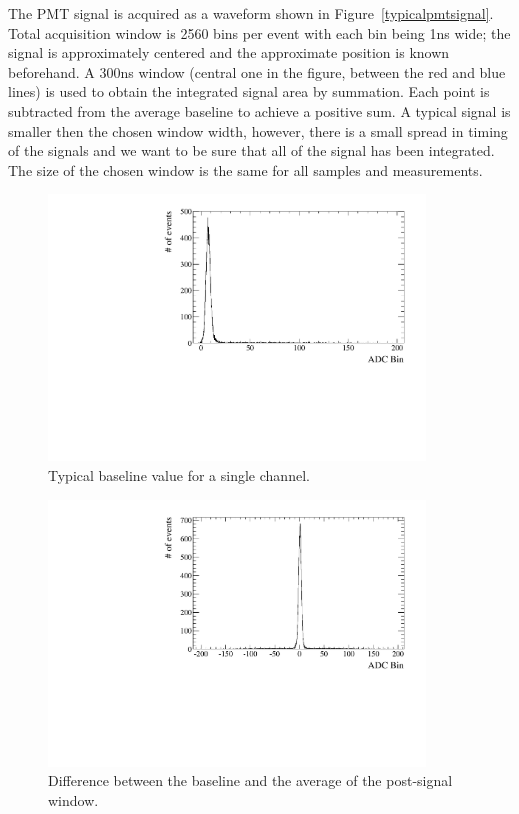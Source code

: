 \documentclass[preprint,12pt]{elsarticle}
\begin{document}
The PMT signal is acquired as a waveform shown in Figure~\ref{typicalpmtsignal}. Total acquisition window is 2560 bins per event with each bin being 1ns wide; the signal is approximately centered and the approximate position is known beforehand. A 300ns window (central one in the figure, between the red and blue lines) is used to obtain the integrated signal area by summation. Each point is subtracted from the average baseline to achieve a positive sum. A typical signal is smaller then the chosen window width, however, there is a small spread in timing of the signals and we want to be sure that all of the signal has been integrated. The size of the chosen window is the same for all samples and measurements.

\begin{figure}[ht]
\centering
\includegraphics[width=100mm]{baselineitself.pdf}
\caption{Typical baseline value for a single channel.} \label{typicalbaseline}
\end{figure}

\begin{figure}[ht]
\centering
\includegraphics[width=100mm]{baselinedifference.pdf}
\caption{Difference between the baseline and the average of the post-signal window.} \label{baselinedifference}
\end{figure}
\end{document}
